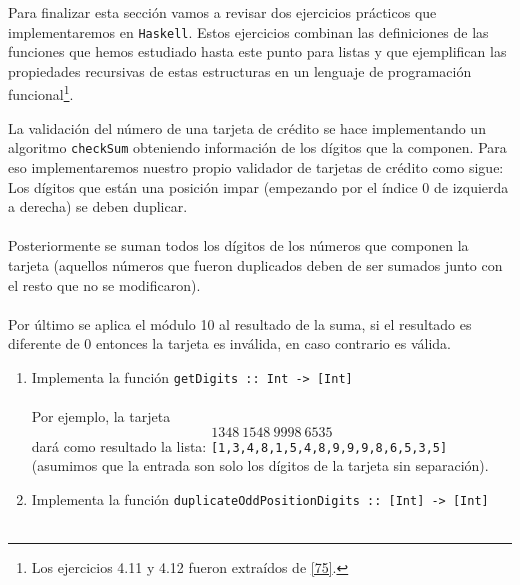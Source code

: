     Para finalizar esta sección vamos a revisar dos ejercicios prácticos que implementaremos en \texttt{Haskell}. Estos ejercicios combinan las definiciones de las funciones que hemos estudiado hasta este punto para listas y que ejemplifican las propiedades recursivas de estas estructuras en un lenguaje de programación funcional\footnote{Los ejercicios 4.11 y 4.12 fueron extraídos de \hyperlink{75}{[75]}.}.


    \begin{exercise}
        La validación del número de una tarjeta de crédito se hace implementando un algoritmo \texttt{checkSum} obteniendo información de los dígitos que la componen. Para eso implementaremos nuestro propio validador de tarjetas de crédito como sigue:\\
    
        Los dígitos que están una posición impar (empezando por el índice 0 de izquierda a derecha) se deben duplicar. \\\\
        Posteriormente se suman todos los dígitos de los números que componen la tarjeta (aquellos números que fueron duplicados deben de ser sumados junto con el resto que no se modificaron).\\\\
        Por último se aplica el módulo 10 al resultado de la suma, si el resultado es diferente de 0 entonces la tarjeta es inválida, en caso contrario es válida.\\
        \begin{enumerate} 
           \item  Implementa la función {\tt getDigits :: Int ->\ [Int]} \\\\
                  Por ejemplo, la tarjeta \[1348\ 1548\ 9998\ 6535\] dará como resultado la lista: \texttt{[1,3,4,8,1,5,4,8,9,9,9,8,6,5,3,5]} \\
                  (asumimos que la entrada son solo los dígitos de la tarjeta sin separación).\\
           \item  Implementa la función \texttt{duplicateOddPositionDigits ::  [Int] ->\ [Int]} \\\\

\end{enumerate}
\end{exercise}
